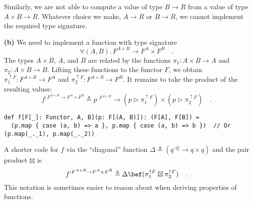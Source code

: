 Similarly, we are not able to compute a value of type $B\rightarrow R$
from a value of type $A\times B\rightarrow R$. Whatever choice we
make, $A\rightarrow R$ or $B\rightarrow R$, we cannot implement
the required type signature.

\textbf{(b)} We need to implement a function with type signature
\[
\forall(A,B).\,F^{A\times B}\rightarrow F^{A}\times F^{B}\quad.
\]
The types $A\times B$, $A$, and $B$ are related by the functions
$\pi_{1}:A\times B\rightarrow A$ and $\pi_{2}:A\times B\rightarrow B$.
Lifting these functions to the functor $F$, we obtain $\pi_{1}^{\uparrow F}:F^{A\times B}\rightarrow F^{A}$
and $\pi_{2}^{\uparrow F}:F^{A\times B}\rightarrow F^{B}$. It remains
to take the product of the resulting values:
\[
f^{:F^{A\times B}\rightarrow F^{A}\times F^{B}}\triangleq p^{:F^{A\times B}}\rightarrow(p\triangleright\pi_{1}^{\uparrow F})\times(p\triangleright\pi_{2}^{\uparrow F})\quad.
\]
\begin{lstlisting}
def f[F[_]: Functor, A, B](p: F[(A, B)]): (F[A], F[B]) =
  (p.map { case (a, b) => a }, p.map { case (a, b) => b })  // Or (p.map(_._1), p.map(_._2))
\end{lstlisting}
A shorter code for $f$ via the \textsf{``}diagonal\textsf{''} function $\Delta\triangleq(q^{:Q}\rightarrow q\times q)$
and the pair product $\boxtimes$ is
\[
f^{:F^{A\times B}\rightarrow F^{A}\times F^{B}}\triangleq\Delta\bef(\pi_{1}^{\uparrow F}\boxtimes\pi_{2}^{\uparrow F})\quad.
\]
This notation is sometimes easier to reason about when deriving properties
of functions.

